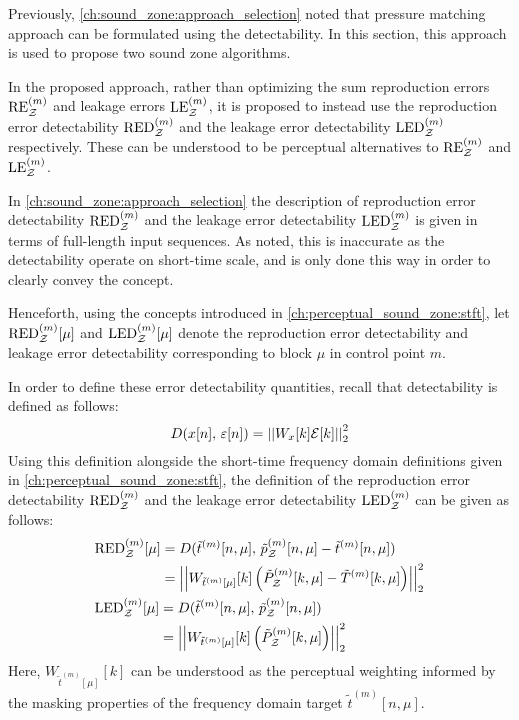 Previously, \autoref{ch:sound_zone:approach_selection} noted that pressure matching approach can be formulated using the detectability.
In this section, this approach is used to propose two sound zone algorithms.

In the proposed approach, rather than optimizing the sum reproduction errors 
$\text{RE}^{(m)}_{\mathcal{Z}}$ and leakage errors $\text{LE}^{(m)}_{\mathcal{Z}}$, it is proposed to instead use
the reproduction error detectability $\text{RED}^{(m)}_{\mathcal{Z}}$ and the leakage error detectability $\text{LED}^{(m)}_{\mathcal{Z}}$ respectively.
These can be understood to be perceptual alternatives to $\text{RE}^{(m)}_{\mathcal{Z}}$ and $\text{LE}^{(m)}_{\mathcal{Z}}$.

In \autoref{ch:sound_zone:approach_selection} the description of reproduction error detectability $\text{RED}^{(m)}_{\mathcal{Z}}$ 
and the leakage error detectability $\text{LED}^{(m)}_{\mathcal{Z}}$ is given in terms of full-length input sequences.
As noted, this is inaccurate as the detectability operate on short-time scale, and is only done this way in order to clearly convey the concept. 

Henceforth, using the concepts introduced in \autoref{ch:perceptual_sound_zone:stft},
let $\text{RED}^{(m)}_{\mathcal{Z}}[\mu]$ and $\text{LED}^{(m)}_{\mathcal{Z}}[\mu]$ denote the reproduction error detectability and  
leakage error detectability corresponding to block $\mu$ in control point $m$. 

In order to define these error detectability quantities, recall that detectability is defined as follows: 
\begin{equation}
    D(x[n],\,\varepsilon[n]) = \norm[2][2]{W_x[k]\mathcal{E}[k]} 
\end{equation}
Using this definition alongside the short-time frequency domain definitions given in \autoref{ch:perceptual_sound_zone:stft}, 
the definition of the reproduction error detectability $\text{RED}^{(m)}_{\mathcal{Z}}$ 
and the leakage error detectability $\text{LED}^{(m)}_{\mathcal{Z}}$ can be given as follows:
\begin{align}
    &\begin{aligned}
        \text{RED}^{(m)}_\zz[\mu] &= D(\tilde{t}^{(m)}[n, \mu],\,\tilde{p}_\zz^{(m)}[n, \mu] - \tilde{t}^{(m)}[n, \mu]) \\
                       &= \norm[2][2]{W_{\tilde{t}^{(m)}[\mu]}[k]
                            \left(\tilde{P}_\zz^{(m)}[k, \mu] - \tilde{T}^{(m)}[k, \mu]\right)}
    \end{aligned}\\
    &\begin{aligned}
        \text{LED}^{(m)}_\zz[\mu] &= D(\tilde{t}^{(m)}[n, \mu],\,\tilde{p}_\zz^{(m)}[n, \mu]) \\
                       &= \norm[2][2]{W_{\tilde{t}^{(m)}[\mu]}[k]
                            \left(\tilde{P}_\zz^{(m)}[k, \mu]\right)}
    \end{aligned}
\end{align}
Here, $W_{\tilde{t}^{(m)}[\mu]}[k]$ can be understood as the perceptual weighting informed by the masking properties of the
frequency domain target $\tilde{t}^{(m)}[n, \mu]$.

